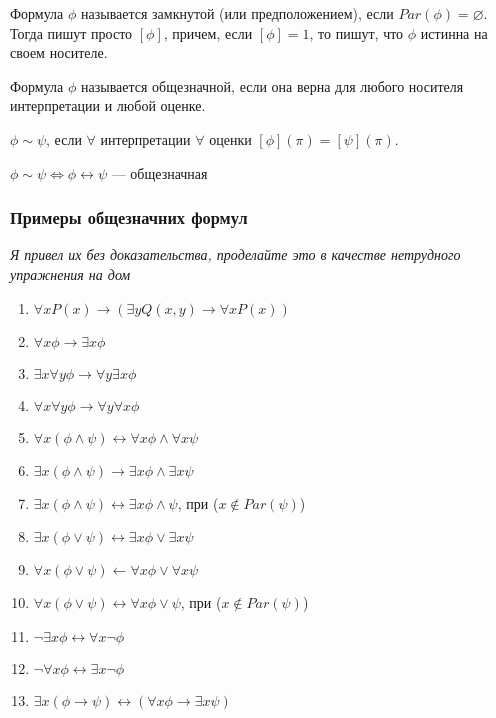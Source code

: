 \begin{definition}
    Формула $\phi$ называется замкнутой (или предположением), если $Par(\phi) = \varnothing$. Тогда пишут просто $[\phi]$, причем, если $[\phi] = 1$, то пишут, что $\phi$ истинна на своем носителе.
\end{definition}

\begin{definition}
    Формула $\phi$ называется общезначной, если она верна для любого носителя интерпретации и любой оценке.
\end{definition}

\begin{definition}
    $\phi \sim \psi$, если $\forall $ интерпретации $\forall $ оценки $[\phi](\pi) = [\psi](\pi)$.
\end{definition}

\begin{note}
    $\phi \sim \psi \Leftrightarrow \phi \leftrightarrow \psi$ --- общезначная
\end{note}

\subsubsection{Примеры общезначних формул}
\begin{center}
    \textit{Я привел их без доказательства, проделайте это в качестве нетрудного упражнения на дом}
\end{center}
\begin{enumerate}
    \item $\forall x P(x) \rightarrow (\exists y Q(x, y) \rightarrow \forall x P(x))$
    \item $\forall x \phi \rightarrow \exists x \phi$
    \item $\exists x \forall y \phi \rightarrow \forall y \exists x \phi$
    \item $\forall x \forall y \phi \rightarrow \forall y \forall x \phi$
    \item $\forall x (\phi \wedge \psi) \leftrightarrow \forall x \phi \wedge \forall x \psi$
    \item $\exists x (\phi \wedge \psi) \rightarrow \exists x \phi \wedge \exists x \psi$
    \item $\exists x (\phi \wedge \psi) \leftrightarrow \exists x \phi \wedge \psi$, при ($x \notin Par(\psi)$)
    \item $\exists x (\phi \vee \psi) \leftrightarrow \exists x \phi \vee \exists x \psi$
    \item $\forall x (\phi \vee \psi) \leftarrow \forall x \phi \vee \forall x \psi$
    \item $\forall x (\phi \vee \psi) \leftrightarrow \forall x \phi \vee \psi$, при ($x \notin Par(\psi)$)
    \item $\neg \exists x \phi \leftrightarrow \forall x \neg \phi$
    \item $\neg \forall x \phi \leftrightarrow \exists x \neg \phi$
    \item $\exists x (\phi \rightarrow \psi) \leftrightarrow (\forall x \phi \rightarrow \exists x \psi)$
\end{enumerate}